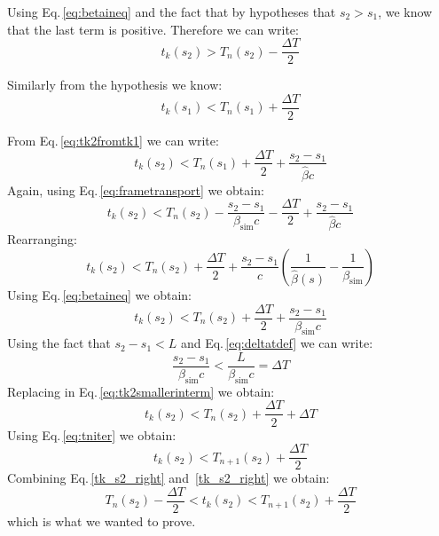 Using Eq.\,\ref{eq:betaineq} and the fact that by hypotheses that $s_2 > s_1$, we know that the last term is positive. Therefore we can write:
\begin{equation}
t_k(s_2) > T_n(s_2) - \frac{\Delta T}{2}
\label{tk_s2_right}
\end{equation}

Similarly from the hypothesis we know:
\begin{equation}
t_k(s_1) < T_n(s_1) + \frac{\Delta T}{2}
\end{equation}

From Eq.\,\ref{eq:tk2fromtk1} we can write:
\begin{equation}
t_k(s_2) < T_n(s_1) + \frac{\Delta T}{2} + \frac{s_2 - s_1}{\hat{\beta} c} 
\end{equation}
Again, using Eq.\,\ref{eq:frametransport} we obtain:
\begin{equation}
t_k(s_2) < T_n(s_2) - \frac{s_2 - s_1}{{\beta}_\text{sim} c}  - \frac{\Delta T}{2} + \frac{s_2 - s_1}{\hat{\beta} c} 
\end{equation}
Rearranging:
\begin{equation}
t_k(s_2) < T_n(s_2) + \frac{\Delta T}{2} + \frac{s_2 - s_1}{c} \left(
\frac{1}{\hat{\beta}(s)} - \frac{1}{\beta_\text{sim}}
\right)
\end{equation}
Using Eq.\,\ref{eq:betaineq} we obtain:
\begin{equation}
t_k(s_2) < T_n(s_2) + \frac{\Delta T}{2} + \frac{s_2 - s_1}{\beta_\text{sim}c}
\label{eq:tk2smallerinterm}
\end{equation}
Using the fact that $s_2 - s_1 < L$ and Eq.\,\ref{eq:deltatdef} we can write:
\begin{equation}
\frac{s_2 - s_1}{\beta_\text{sim}c} < \frac{L}{\beta_\text{sim}c} = \Delta T
\end{equation}
Replacing in Eq.\,\ref{eq:tk2smallerinterm} we obtain:
\begin{equation}
t_k(s_2) < T_n(s_2) + \frac{\Delta T}{2} + \Delta T
\end{equation}
Using Eq.\,\ref{eq:tniter} we obtain:
\begin{equation}
t_k(s_2) < T_{n+1}(s_2) + \frac{\Delta T}{2}
\label{tk_s2_left}
\end{equation}
Combining Eq.\,\ref{tk_s2_right} and~\ref{tk_s2_right} we obtain:
\begin{equation}
T_{n}(s_2) - \frac{\Delta T}{2} < t_k(s_2) < T_{n+1}(s_2) + \frac{\Delta T}{2}
\label{tk_s2_left}
\end{equation}
which is what we wanted to prove.


